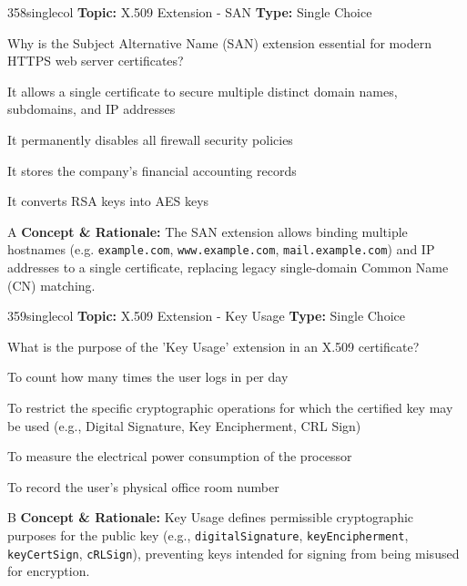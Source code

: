 \begin{qcard}{358}{singlecol}
\textcolor{darkslate!75}{\small\textbf{Topic:} X.509 Extension - SAN \hfill \textbf{Type:} Single Choice}\vspace{0.4em}\par
Why is the Subject Alternative Name (SAN) extension essential for modern HTTPS web server certificates?
\begin{qoptions}
\item It allows a single certificate to secure multiple distinct domain names, subdomains, and IP addresses
\item It permanently disables all firewall security policies
\item It stores the company's financial accounting records
\item It converts RSA keys into AES keys
\end{qoptions}
\end{qcard}
\nopagebreak
\begin{explainbox}{A}
\textbf{Concept \& Rationale:} The SAN extension allows binding multiple hostnames (e.g. \texttt{example.com}, \texttt{www.example.com}, \texttt{mail.example.com}) and IP addresses to a single certificate, replacing legacy single-domain Common Name (CN) matching.
\end{explainbox}

\begin{qcard}{359}{singlecol}
\textcolor{darkslate!75}{\small\textbf{Topic:} X.509 Extension - Key Usage \hfill \textbf{Type:} Single Choice}\vspace{0.4em}\par
What is the purpose of the 'Key Usage' extension in an X.509 certificate?
\begin{qoptions}
\item To count how many times the user logs in per day
\item To restrict the specific cryptographic operations for which the certified key may be used (e.g., Digital Signature, Key Encipherment, CRL Sign)
\item To measure the electrical power consumption of the processor
\item To record the user's physical office room number
\end{qoptions}
\end{qcard}
\nopagebreak
\begin{explainbox}{B}
\textbf{Concept \& Rationale:} Key Usage defines permissible cryptographic purposes for the public key (e.g., \texttt{digitalSignature}, \texttt{keyEncipherment}, \texttt{keyCertSign}, \texttt{cRLSign}), preventing keys intended for signing from being misused for encryption.
\end{explainbox}


